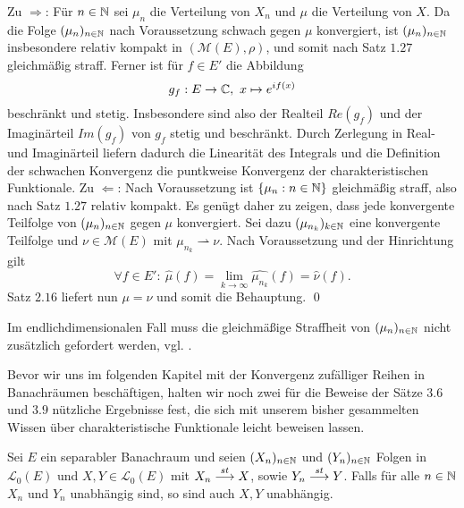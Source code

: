 \begin{proof*}
    Zu $\Rightarrow$: Für $n \in \mathbb{N}$ sei $\mu_n$ die Verteilung von $X_n$ und $\mu$ die Verteilung von $X$. Da die Folge $(\mu_n)_{n \in \mathbb{N}}$ nach Voraussetzung schwach gegen $\mu$ konvergiert, 
    ist $(\mu_n)_{n \in  \mathbb{N}}$ insbesondere relativ kompakt in $(\mathcal{M}(E), \rho)$, und somit nach Satz $1.27$ gleichmäßig straff. 
    Ferner ist für $f \in E'$ die Abbildung 
    $$
        g_f: E \to \mathbb{C},  \ x \mapsto e^{if(x)}
    $$ 
    beschränkt und stetig. Insbesondere sind also der Realteil $Re(g_f)$ und der Imaginärteil $Im(g_f)$ von $g_f$ stetig und beschränkt. 
    Durch Zerlegung in Real- und Imaginärteil liefern dadurch die Linearität des Integrals und die Definition der schwachen Konvergenz die puntkweise Konvergenz der charakteristischen Funktionale. 
    \newline 
    Zu $\Leftarrow$: Nach Voraussetzung ist  $\{\mu_n : n \in \mathbb{N}\}$ gleichmäßig straff, also nach Satz $1.27$ relativ kompakt. Es genügt daher zu zeigen, dass jede konvergente Teilfolge von $(\mu_n)_{n \in \mathbb{N}}$ gegen $\mu$ konvergiert. 
    Sei dazu $(\mu_{n_k})_{k \in \mathbb{N}}$ eine konvergente Teilfolge und $\nu \in \mathcal{M}(E)$ mit $\mu_{n_k} \rightharpoonup \nu$. Nach Voraussetzung und der Hinrichtung gilt 
    $$
        \forall f \in E': \ \widehat{\mu}(f) = \lim_{k \to \infty} \widehat{\mu_{n_k}}(f) = \widehat{\nu}(f).
    $$
    Satz $2.16$ liefert nun $\mu = \nu$ und somit die Behauptung. \qed
\end{proof*}

\begin{remark}
    Im endlichdimensionalen Fall muss die gleichmäßige Straffheit von $(\mu_n)_{n \in \mathbb{N}}$ nicht zusätzlich gefordert werden, vgl. \cite[Satz 8.7.5]{gs}. 
\end{remark}

Bevor wir uns im folgenden Kapitel mit der Konvergenz zufälliger Reihen in Banachräumen beschäftigen, halten wir noch zwei für die Beweise der Sätze $3.6$ und $3.9$ nützliche Ergebnisse fest, die sich mit unserem bisher gesammelten Wissen über charakteristische Funktionale leicht beweisen lassen.  

\begin{proposition}
    Sei $E$ ein separabler Banachraum und seien $(X_n)_{n \in \mathbb{N}}$ und $(Y_n)_{n \in \mathbb{N}}$ Folgen in $\mathcal{L}_0(E)$ und \mbox{$X,Y \in \mathcal{L}_0(E)$} mit $X_n \overset{st}{\longrightarrow} X$, sowie $Y_n \overset{st}{\longrightarrow} Y$. 
    Falls für alle $n \in \mathbb{N}$ $X_n$ und $Y_n$ unabhängig sind, so sind auch $X,Y$ unabhängig. 
\end{proposition}

